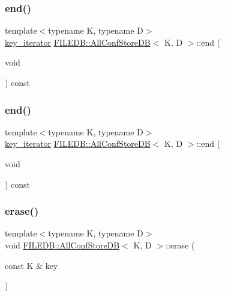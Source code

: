 \subsubsection{\texorpdfstring{end()}{end()}\hspace{0.1cm}{\footnotesize\ttfamily [2/3]}}
{\footnotesize\ttfamily template$<$typename K, typename D$>$ \\
\mbox{\hyperlink{classFILEDB_1_1AllConfStoreDB_a2ce8981ca7049ed0c2c6e438873a9c1b}{key\+\_\+iterator}} \mbox{\hyperlink{classFILEDB_1_1AllConfStoreDB}{F\+I\+L\+E\+D\+B\+::\+All\+Conf\+Store\+DB}}$<$ K, D $>$\+::end (\begin{DoxyParamCaption}\item[{void}]{ }\end{DoxyParamCaption}) const\hspace{0.3cm}{\ttfamily [inline]}}

\mbox{\label{classFILEDB_1_1AllConfStoreDB_a213c914b326e7769411e305ceb375b1d}} 
\subsubsection{\texorpdfstring{end()}{end()}\hspace{0.1cm}{\footnotesize\ttfamily [3/3]}}
{\footnotesize\ttfamily template$<$typename K, typename D$>$ \\
\mbox{\hyperlink{classFILEDB_1_1AllConfStoreDB_a2ce8981ca7049ed0c2c6e438873a9c1b}{key\+\_\+iterator}} \mbox{\hyperlink{classFILEDB_1_1AllConfStoreDB}{F\+I\+L\+E\+D\+B\+::\+All\+Conf\+Store\+DB}}$<$ K, D $>$\+::end (\begin{DoxyParamCaption}\item[{void}]{ }\end{DoxyParamCaption}) const\hspace{0.3cm}{\ttfamily [inline]}}

\mbox{\label{classFILEDB_1_1AllConfStoreDB_afb092d33f9ca14ca30918d6cb8251fdb}} 
\subsubsection{\texorpdfstring{erase()}{erase()}\hspace{0.1cm}{\footnotesize\ttfamily [1/3]}}
{\footnotesize\ttfamily template$<$typename K, typename D$>$ \\
void \mbox{\hyperlink{classFILEDB_1_1AllConfStoreDB}{F\+I\+L\+E\+D\+B\+::\+All\+Conf\+Store\+DB}}$<$ K, D $>$\+::erase (\begin{DoxyParamCaption}\item[{const K \&}]{key }\end{DoxyParamCaption})\hspace{0.3cm}{\ttfamily [inline]}}

